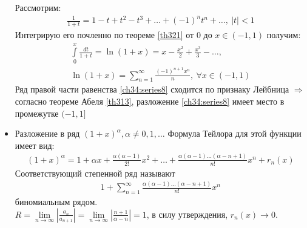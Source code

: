 \begin{itemize}
    Рассмотрим:
    \begin{gather}
      \frac{1}{1 + t} = 1 - t + t^2 - t^3 + \dots + (-1)^n t^n + \dots, \ |t| < 1
      \label{ch34:series7}
    \end{gather}
    Интегрирую его почленно по теореме \eqref{th321} от $0$ до $x \in (-1, 1)$
    получим:
    \begin{gather*}
      \int\limits_0^x \frac{dt}{1+t} = \ln(1+x) = x - \frac{x^2}{2} +
      \frac{x^3}{3} - \dots, \\
      \ln(1+x) = \sum\limits_{n = 1}^{\infty} \frac{(-1)^{n+1} x^n}{n}, \
      \forall x \in (-1, 1)
      \label{ch34:series8}
    \end{gather*}
    Ряд правой части равенства \eqref{ch34:series8} сходится по признаку Лейбница
    $\Rightarrow$ согласно теореме Абеля \eqref{th313}, разложение
    \eqref{ch34:series8} имеет место в промежутке $(-1, 1]$
  \item Разложение в ряд $(1 + x)^\alpha, \alpha \not = 0, 1, \dots$
    Формула Тейлора для этой функции имеет вид:
    \begin{gather}
      (1+x)^\alpha = 1 + \alpha x + \frac{\alpha(\alpha - 1)}{2!}x^2 + \dots +
      \frac{\alpha(\alpha - 1)\dots(\alpha - n + 1)}{n!} x^n + r_n(x)
      \label{ch34:series9}
    \end{gather}
    Соответствующий степенной ряд называют
    \begin{gather}
      1 + \sum\limits_{n = 1}^{\infty} \frac{\alpha(\alpha - 1)\dots(\alpha
      -n + 1)}{n!} x^n \label{ch34:series10}
    \end{gather}
    биномиальным рядом. \\
    $R = \lim\limits_{n \to \infty} \left|\frac{a_n}{a_{n+1}}\right| =
    \lim\limits_{n \to \infty} \left|\frac{n+1}{\alpha - n}\right| = 1$,
    в силу утверждения, $r_n(x) \to 0$.


\end{itemize}
